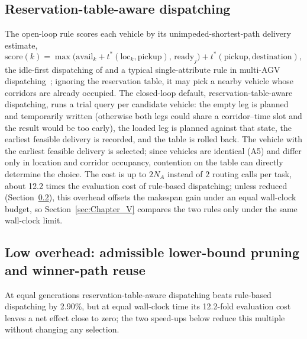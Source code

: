 \documentclass[preprint,review,12pt,authoryear]{elsarticle}
\newcommand{\CostMultBefore}{12.2}
\newcommand{\GainProbeSameGen}{2.90\%}
\begin{document}
\subsection{Reservation-table-aware dispatching}
\label{sec:dispatch}

The open-loop rule scores each vehicle by its unimpeded-shortest-path delivery estimate,
\begin{equation}
\label{eq:rule}
\mathrm{score}(k)=\max\bigl(\mathrm{avail}_k+t^{*}(\mathrm{loc}_k,\text{pickup}),\,
\mathrm{ready}_j\bigr)+t^{*}(\text{pickup},\text{destination}),
\end{equation}
the idle-first dispatching of \citet{li2026framework} and a typical single-attribute rule in multi-AGV dispatching~\citep{lu2022agv}; ignoring the reservation table, it may pick a nearby vehicle whose corridors are already occupied.
The closed-loop default, reservation-table-aware dispatching, runs a trial query per candidate vehicle: the empty leg is planned and temporarily written (otherwise both legs could share a corridor--time slot and the result would be too early), the loaded leg is planned against that state, the earliest feasible delivery is recorded, and the table is rolled back.
The vehicle with the earliest feasible delivery is selected; since vehicles are identical (A5) and differ only in location and corridor occupancy, contention on the table can directly determine the choice.
The cost is up to $2N_A$ instead of $2$ routing calls per task, about \CostMultBefore{} times the evaluation cost of rule-based dispatching; unless reduced (Section~\ref{sec:speedup}), this overhead offsets the makespan gain under an equal wall-clock budget, so Section~\ref{sec:Chapter_V} compares the two rules only under the same wall-clock limit.

\subsection{Low overhead: admissible lower-bound pruning and winner-path reuse}
\label{sec:speedup}

At equal generations reservation-table-aware dispatching beats rule-based dispatching by \GainProbeSameGen{}, but at equal wall-clock time its \CostMultBefore{}-fold evaluation cost leaves a net effect close to zero; the two speed-ups below reduce this multiple without changing any selection.
\end{document}
